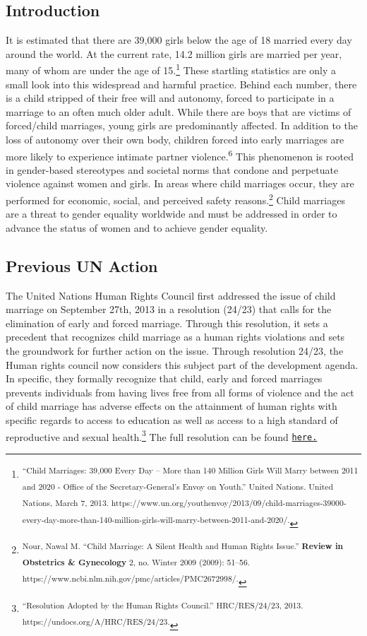 \documentclass[10pt, letterpaper]{article}
\begin{document}
\subsection{Introduction}

It is estimated that there are 39,000 girls below the age of 18 married
every day around the world. At the current rate, 14.2 million girls are
married per year, many of whom are under the age of 15.\footnote{\textsuperscript{``Child
  Marriages: 39,000 Every Day -- More than 140 Million Girls Will Marry
  between 2011 and 2020 - Office of the Secretary-General's Envoy on
  Youth.'' United Nations. United Nations, March 7, 2013.
  https://www.un.org/youthenvoy/2013/09/child-marriages-39000-every-day-more-than-140-million-girls-will-marry-between-2011-and-2020/.}}
These startling statistics are only a small look into this widespread
and harmful practice. Behind each number, there is a child stripped of
their free will and autonomy, forced to participate in a marriage to an
often much older adult. While there are boys that are victims of
forced/child marriages, young girls are predominantly affected. In
addition to the loss of autonomy over their own body, children forced
into early marriages are more likely to experience intimate partner
violence.\textsuperscript{6} This phenomenon is rooted in gender-based
stereotypes and societal norms that condone and perpetuate violence
against women and girls. In areas where child marriages occur, they are
performed for economic, social, and perceived safety reasons.\footnote{\textsuperscript{Nour,
  Nawal M. ``Child Marriage: A Silent Health and Human Rights Issue.''
  \textbf{Review in Obstetrics \& Gynecology} 2, no. Winter 2009 (2009):
  51--56. https://www.ncbi.nlm.nih.gov/pmc/articles/PMC2672998/.}} Child
marriages are a threat to gender equality worldwide and must be
addressed in order to advance the status of women and to achieve gender
equality.

\subsection{Previous UN Action}

The United Nations Human Rights Council first addressed the issue of
child marriage on September 27th, 2013 in a resolution (24/23) that
calls for the elimination of early and forced marriage. Through this
resolution, it sets a precedent that recognizes child marriage as a
human rights violations and sets the groundwork for further action on
the issue. Through resolution 24/23, the Human rights council now
considers this subject part of the development agenda. In specific, they
formally recognize that child, early and forced marriages prevents
individuals from having lives free from all forms of violence and the
act of child marriage has adverse effects on the attainment of human
rights with specific regards to access to education as well as access to
a high standard of reproductive and sexual health.\footnote{\textsuperscript{``Resolution
  Adopted by the Human Rights Council.'' HRC/RES/24/23, 2013.
  https://undocs.org/A/HRC/RES/24/23.}} The full resolution can be found
\texttt{\href{https://undocs.org/A/HRC/RES/24/23}{{here.}}} \\
\end{document}
